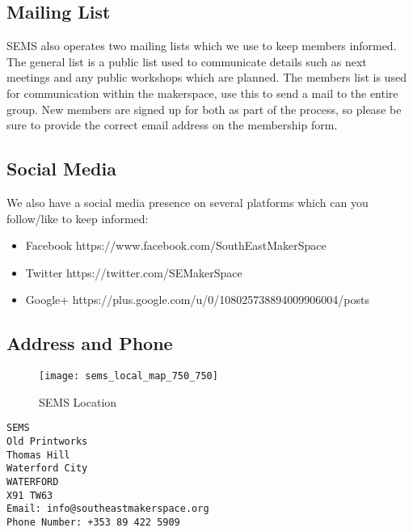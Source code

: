 \documentclass{article}
\begin{document}
\subsection*{Mailing List}
SEMS also operates two mailing lists which we use to keep members informed. The general list is a public list used to communicate details such as next meetings and any public workshops which are planned. The members list is used for communication within the makerspace, use this to send a mail to the entire group. New members are signed up for both as part of the process, so please be sure to provide the correct email address on the membership form.


\subsection*{Social Media}
We also have a social media presence on several platforms which can you
follow/like to keep informed:

\begin{itemize}
\item Facebook https://www.facebook.com/SouthEastMakerSpace
\item Twitter https://twitter.com/SEMakerSpace
\item Google+ https://plus.google.com/u/0/108025738894009906004/posts
\end{itemize}


\subsection*{Address and Phone}

%
\begin{figure}[ht]
	\centering
	\texttt{[image: sems\_local\_map\_750\_750]}
	\caption{SEMS Location}
	\label{fig:sems_location}
\end{figure}
%


\begin{verbatim}
SEMS
Old Printworks
Thomas Hill
Waterford City
WATERFORD
X91 TW63
Email: info@southeastmakerspace.org
Phone Number: +353 89 422 5909
\end{verbatim} \par
\end{document}
